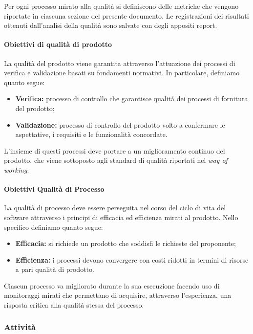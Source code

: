 		Per ogni processo mirato alla qualità si definiscono delle metriche che vengono riportate in ciascuna sezione del presente documento.
		Le registrazioni dei risultati ottenuti dall'analisi della qualità sono salvate con degli appositi report.

		\paragraph{Obiettivi di qualità di prodotto}

			La qualità del prodotto viene garantita attraverso l'attuazione dei processi di verifica e validazione basati su fondamenti normativi. In particolare, definiamo quanto segue:
			\begin{itemize}
				\item \textbf{Verifica:} processo di controllo che garantisce qualità dei processi di fornitura del prodotto;
				\item \textbf{Validazione:} processo di controllo del prodotto volto a confermare le aspettative, i requisiti e le funzionalità concordate.
			\end{itemize}

			L'insieme di questi processi deve portare a un miglioramento continuo del prodotto, che viene sottoposto agli standard di qualità riportati nel \textit{way of working}.

		\paragraph{Obiettivi Qualità di Processo}

			La qualità di processo deve essere perseguita nel corso del ciclo di vita del software attraverso i principi di efficacia ed efficienza mirati al prodotto.
			Nello specifico definiamo quanto segue:
			\begin{itemize}
				\item \textbf{Efficacia:} si richiede un prodotto che soddisfi le richieste del proponente;
				\item \textbf{Efficienza:} i processi devono convergere con costi ridotti in termini di risorse a pari qualità di prodotto.
			\end{itemize}

			Ciascun processo va migliorato durante la sua esecuzione facendo uso di monitoraggi mirati che permettano di acquisire, attraverso l'esperienza, una risposta critica alla qualità stessa del processo.

	\subsubsection{Attività}

